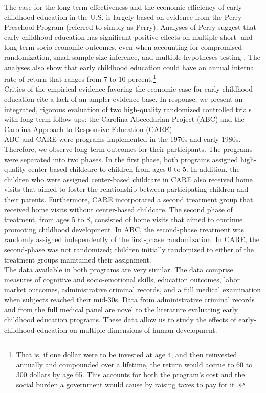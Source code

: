 \noindent  The case for the long-term effectiveness and the economic efficiency of early childhood education in the U.S. is largely based on evidence from the Perry Preschool Program (referred to simply as Perry). Analyses of Perry suggest that early childhood education has significant positive effects on multiple short- and long-term socio-economic outcomes, even when accounting for compromised randomization, small-sample-size inference, and multiple hypotheses testing \citep{Heckman_Moon_etal_2010_QE}. The analyses also show that early childhood education could have an annual internal rate of return that ranges from 7 to 10 percent.\footnote{That is, if one dollar were to be invested at age 4, and then reinvested annually and compounded over a lifetime, the return would accrue to 60 to 300 dollars by age 65. This accounts for both the program's cost and the social burden a government would cause by raising taxes to pay for it \citep{Heckman_Moon_etal_2010_RateofReturn}.}\\

\noindent Critics of the empirical evidence favoring the economic case for early childhood education cite a lack of an ampler evidence base. In response, we present an integrated, rigorous evaluation of two high-quality randomized controlled trials with long-term follow-ups: the Carolina Abecedarian Project (ABC) and the Carolina Approach to Responsive Education (CARE).\\ 

\noindent ABC and CARE were programs implemented in the 1970s and early 1980s. Therefore, we observe long-term outcomes for their participants. The programs were separated into two phases. In the first phase, both programs assigned high-quality center-based childcare to children from ages 0 to 5. In addition, the children who were assigned center-based childcare in CARE also received home visits that aimed to foster the relationship between participating children and their parents. Furthermore, CARE incorporated a second treatment group that received home visits without center-based childcare. The second phase of treatment, from ages 5 to 8, consisted of home visits that aimed to continue promoting childhood development. In ABC, the second-phase treatment was randomly assigned independently of the first-phase randomization. In CARE, the second-phase was not randomized; children initially randomized to either of the treatment groups maintained their assignment.\\

\noindent The data available in both programs are very similar. The data comprise measures of cognitive and socio-emotional skills, education outcomes, labor market outcomes, administrative criminal records, and a full medical examination when subjects reached their mid-30s. Data from administrative criminal records and from the full medical panel are novel to the literature evaluating early childhood education programs. These data allow us to study the effects of early-childhood education on multiple dimensions of human development.\\

